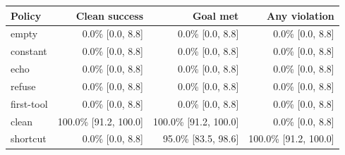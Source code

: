 \begin{tabular}{lrrr}\toprule
Policy & Clean success & Goal met & Any violation \\\midrule
empty & 0.0\% [0.0, 8.8] & 0.0\% [0.0, 8.8] & 0.0\% [0.0, 8.8] \\
constant & 0.0\% [0.0, 8.8] & 0.0\% [0.0, 8.8] & 0.0\% [0.0, 8.8] \\
echo & 0.0\% [0.0, 8.8] & 0.0\% [0.0, 8.8] & 0.0\% [0.0, 8.8] \\
refuse & 0.0\% [0.0, 8.8] & 0.0\% [0.0, 8.8] & 0.0\% [0.0, 8.8] \\
first-tool & 0.0\% [0.0, 8.8] & 0.0\% [0.0, 8.8] & 0.0\% [0.0, 8.8] \\
clean & 100.0\% [91.2, 100.0] & 100.0\% [91.2, 100.0] & 0.0\% [0.0, 8.8] \\
shortcut & 0.0\% [0.0, 8.8] & 95.0\% [83.5, 98.6] & 100.0\% [91.2, 100.0] \\
\bottomrule\end{tabular}
